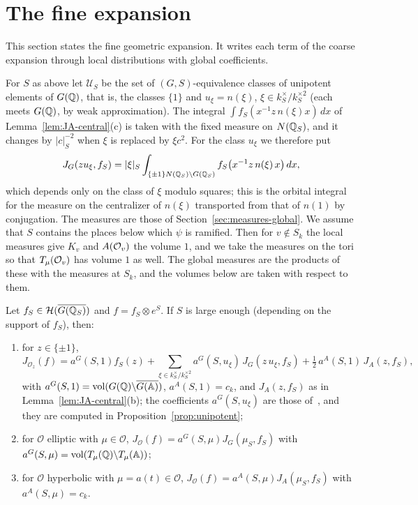 \section{The fine expansion}\label{sec:fine}

This section states the fine geometric expansion. It writes each
term of the coarse expansion through local distributions with global
coefficients.


For $S$ as above let $\mathcal U_S$ be the set of $(G,S)$-equivalence
classes of unipotent elements of $G(\mathbb{Q})$, that is, the classes
$\{1\}$ and $u_\xi=n(\xi)$, $\xi\in k_S^\times/k_S^{\times2}$ (each
meets $G(\mathbb{Q})$, by weak approximation). The integral
$\int f_S(x^{-1}z\,n(\xi)x)\,dx$ of Lemma~\ref{lem:JA-central}(c) is taken
with the fixed measure on $N(\mathbb{Q}_S)$, and it changes by $|c|_S^{-2}$ when
$\xi$ is replaced by $\xi c^2$. For the class $u_\xi$ we therefore put
\[
J_G(zu_\xi,f_S)=|\xi|_S\int_{\{\pm1\}N(\mathbb{Q}_S)\backslash G(\mathbb{Q}_S)}
f_S\bigl(x^{-1}z\,n(\xi)\,x\bigr)\,dx,
\]
which depends only on the class of $\xi$ modulo squares; this is the
orbital integral for the measure on the centralizer of $n(\xi)$
transported from that of $n(1)$ by conjugation. The measures are
those of Section~\ref{sec:measures-global}. We assume that $S$ contains
the places below which $\psi$ is ramified. Then for $v\notin S_k$ the
local measures give $K_v$ and $A(\mathcal{O}_v)$ the volume $1$, and we take the
measures on the tori so that $T_\mu(\mathcal{O}_v)$ has volume $1$ as well. The
global measures are the products of these with the measures at $S_k$,
and the volumes below are taken with respect to them.

\begin{theorem}\label{thm:fine}
Let $f_S\in\mathcal H(\overline{G(\mathbb{Q}_S)})$ and $f=f_S\otimes e^S$. If
$S$ is large enough (depending on the support of $f_S$), then:
\begin{enumerate}[label=(\alph*)]
\item for $z\in\{\pm1\}$,
  \[
  J_{\mathcal O_z}(f)=a^G(S,1)f_S(z)+\sum_{\xi\in k_S^\times/k_S^{\times2}}
  a^G(S,u_\xi)\,J_G(z\,u_\xi,f_S)+\tfrac12\,a^A(S,1)\,J_A(z,f_S),
  \]
  with $a^G(S,1)=\operatorname{vol}(G(\mathbb{Q})\backslash\overline{G(\mathbb{A})})$, $a^A(S,1)=c_k$, and
  $J_A(z,f_S)$ as in Lemma~\ref{lem:JA-central}(b); the coefficients
  $a^G(S,u_\xi)$ are those of~\cite{Ar86,Li14a}, and they are computed in
  Proposition~\ref{prop:unipotent};
\item for $\mathcal O$ elliptic with $\mu\in\mathcal O$,
  $J_{\mathcal O}(f)=a^G(S,\mu)J_G(\mu_S,f_S)$ with
  $a^G(S,\mu)=\operatorname{vol}(T_\mu(\mathbb{Q})\backslash T_\mu(\mathbb{A}))$;
\item for $\mathcal O$ hyperbolic with $\mu=a(t)\in\mathcal O$,
  $J_{\mathcal O}(f)=a^A(S,\mu)J_A(\mu_S,f_S)$ with $a^A(S,\mu)=c_k$.
\end{enumerate}
\end{theorem}

